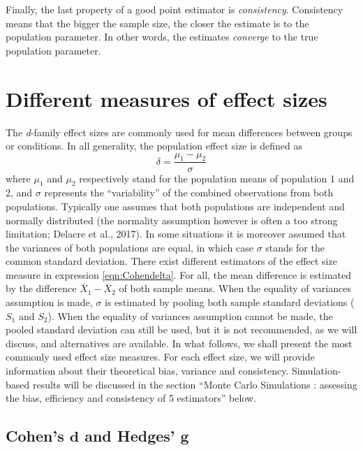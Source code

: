 \documentclass[
  english,
  man,floatsintext]{apa6}
\begin{document}
Finally, the last property of a good point estimator is \emph{consistency}. Consistency means that the bigger the sample size, the closer the estimate is to the population parameter. In other words, the estimates \emph{converge} to the true population parameter.

\hypertarget{different-measures-of-effect-sizes}{%
\section{Different measures of effect sizes}\label{different-measures-of-effect-sizes}}

The \emph{d}-family effect sizes are commonly used for mean differences between groups or conditions. In all generality, the population effect size is defined as
\begin{equation} 
\delta = \frac{\mu_{1}-\mu_{2}}{\sigma} 
\label{eqn:Cohendelta}
\end{equation}
where \(\mu_1\) and \(\mu_2\) respectively stand for the population means of population 1 and 2, and \(\sigma\) represents the ``variability'' of the combined observations from both populations. Typically one assumes that both populations are independent and normally distributed (the normality assumption however is often a too strong limitation; Delacre et al., 2017). In some situations it is moreover assumed that the variances of both populations are equal, in which case \(\sigma\) stands for the common standard deviation. There exist different estimators of the effect size measure in expression \ref{eqn:Cohendelta}. For all, the mean difference is estimated by the difference \(\bar{X}_1-\bar{X}_2\) of both sample means. When the equality of variances assumption is made, \(\sigma\) is estimated by pooling both sample standard deviations (\(S_1\) and \(S_2\)). When the equality of variances assumption cannot be made, the pooled standard deviation can still be used, but it is not recommended, as we will discuss, and alternatives are available. In what follows, we shall present the most commonly used effect size measures. For each effect size, we will provide information about their theoretical bias, variance and consistency. Simulation-based results will be discussed in the section ``Monte Carlo Simulations : assessing the bias, efficiency and consistency of 5 estimators'' below.

\hypertarget{cohens-bmd-and-hedges-bmg}{%
\subsection{\texorpdfstring{Cohen's \(\bm{d}\) and Hedges' \(\bm{g}\)}{Cohen's \textbackslash bm\{d\} and Hedges' \textbackslash bm\{g\}}}\label{cohens-bmd-and-hedges-bmg}}
\end{document}
